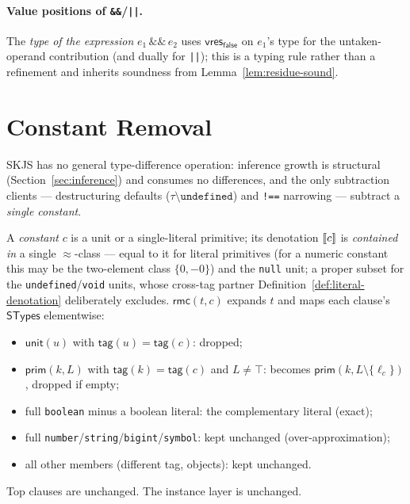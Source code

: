 \documentclass[11pt]{article}
\newcommand{\STypes}{\mathsf{STypes}}
\newcommand{\tagfn}{\mathsf{tag}}
\begin{document}
\paragraph{Value positions of \texttt{\&\&}/\texttt{||}.}
The \emph{type of the expression} $e_1\,\texttt{\&\&}\,e_2$ uses
$\mathsf{vres}_{\mathsf{false}}$ on $e_1$'s type for the untaken-operand
contribution (and dually for \texttt{||}); this is a typing rule rather than
a refinement and inherits soundness from Lemma~\ref{lem:residue-sound}.

\section{Constant Removal}
\label{sec:removeconstant}

SKJS has no general type-difference operation: inference growth is
structural (Section~\ref{sec:inference}) and consumes no differences, and
the only subtraction clients — destructuring defaults
($\tau \setminus \texttt{undefined}$) and \texttt{!==} narrowing —
subtract a \emph{single constant}.

\begin{definition}
\label{def:rmc}
A \emph{constant} $c$ is a unit or a single-literal primitive; its
denotation $\llbracket c \rrbracket$ is \emph{contained in} a single $\approx$-class —
equal to it for literal primitives (for a numeric constant this may be the
two-element class $\{0, -0\}$) and the \texttt{null} unit; a proper
subset for the \texttt{undefined}/\texttt{void} units, whose cross-tag
partner Definition~\ref{def:literal-denotation} deliberately excludes.
$\mathsf{rmc}(t, c)$ expands $t$ and maps each clause's $\STypes$ elementwise:
\begin{itemize}
\item $\mathsf{unit}(u)$ with $\tagfn(u) = \tagfn(c)$: dropped;
\item $\mathsf{prim}(k, L)$ with $\tagfn(k) = \tagfn(c)$ and $L \neq \top$:
  becomes $\mathsf{prim}(k, L \setminus \{\ell_c\})$, dropped if empty;
\item full \texttt{boolean} minus a boolean literal: the complementary
  literal (exact);
\item full \texttt{number}/\texttt{string}/\texttt{bigint}/\texttt{symbol}:
  kept unchanged (over-approximation);
\item all other members (different tag, objects): kept unchanged.
\end{itemize}
Top clauses are unchanged. The instance layer is unchanged.
\end{definition}
\end{document}
